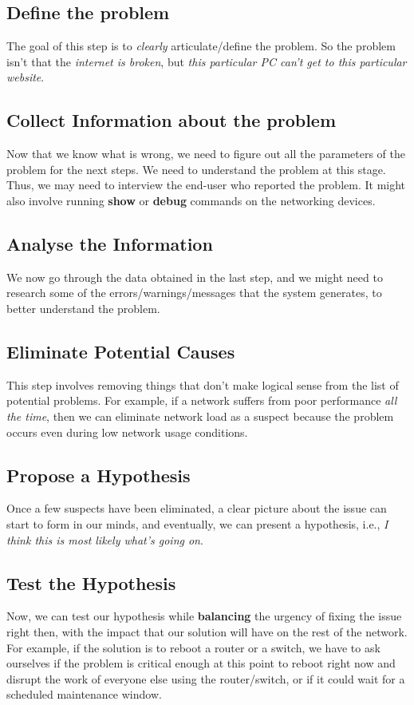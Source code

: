 \subsection{Define the problem}
The goal of this step is to \textit{clearly} articulate/define the problem. So the problem isn't that the \textit{internet is broken}, but \textit{this particular PC can't get to this particular website}. 

\subsection{Collect Information about the problem}
Now that we know what is wrong, we need to figure out all the parameters of the problem for the next steps. We need to understand the problem at this stage. Thus, we may need to interview the end-user who reported the problem. It might also involve running \textbf{show} or \textbf{debug} commands on the networking devices. 

\subsection{Analyse the Information}
We now go through the data obtained in the last step, and we might need to research some of the errors/warnings/messages that the system generates, to better understand the problem.

\subsection{Eliminate Potential Causes}
This step involves removing things that don't make logical sense from the list of potential problems. For example, if a network suffers from poor performance \textit{all the time}, then we can eliminate network load as a suspect because the problem occurs even during low network usage conditions. 

\subsection{Propose a Hypothesis}
Once a few suspects have been eliminated, a clear picture about the issue can start to form in our minds, and eventually, we can present a hypothesis, i.e., \textit{I think this is most likely what's going on}. 

\subsection{Test the Hypothesis}
Now, we can test our hypothesis while \textbf{balancing} the urgency of fixing the issue right then, with the impact that our solution will have on the rest of the network. For example, if the solution is to reboot a router or a switch, we have to ask ourselves if the problem is critical enough at this point to reboot right now and disrupt the work of everyone else using the router/switch, or if it could wait for a scheduled maintenance window. 

